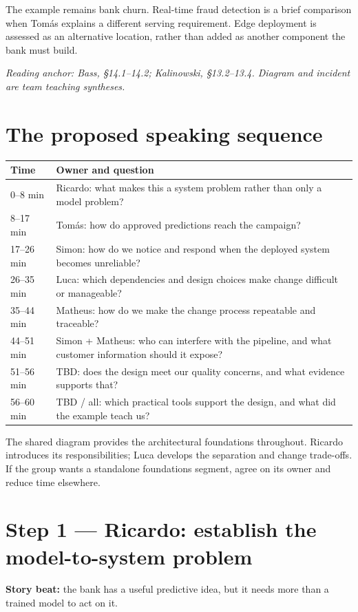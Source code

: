\documentclass[12pt,a4paper]{article}
\newcommand{\source}[1]{\par\textcolor{teal!70!black}{\textit{Reading anchor: #1}}\par}
\begin{document}
The example remains bank churn. Real-time fraud detection is a brief comparison when Tomás explains a different serving requirement. Edge deployment is assessed as an alternative location, rather than added as another component the bank must build.

\source{Bass, \S14.1--14.2; Kalinowski, \S13.2--13.4. Diagram and incident are team teaching syntheses.}

\section{The proposed speaking sequence}
\begin{tabularx}{\textwidth}{@{}p{}X@{}}
\toprule
\textbf{Time} & \textbf{Owner and question}\\
\midrule
0--8 min & Ricardo: what makes this a system problem rather than only a model problem?\\
8--17 min & Tomás: how do approved predictions reach the campaign?\\
17--26 min & Simon: how do we notice and respond when the deployed system becomes unreliable?\\
26--35 min & Luca: which dependencies and design choices make change difficult or manageable?\\
35--44 min & Matheus: how do we make the change process repeatable and traceable?\\
44--51 min & Simon + Matheus: who can interfere with the pipeline, and what customer information should it expose?\\
51--56 min & TBD: does the design meet our quality concerns, and what evidence supports that?\\
56--60 min & TBD / all: which practical tools support the design, and what did the example teach us?\\
\bottomrule
\end{tabularx}

The shared diagram provides the architectural foundations throughout. Ricardo introduces its responsibilities; Luca develops the separation and change trade-offs. If the group wants a standalone foundations segment, agree on its owner and reduce time elsewhere.

\section{Step 1 --- Ricardo: establish the model-to-system problem}
\textbf{Story beat:} the bank has a useful predictive idea, but it needs more than a trained model to act on it.
\end{document}
